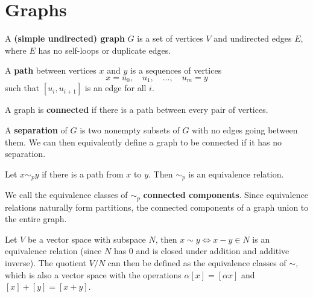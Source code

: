 \documentclass[twoside,10pt]{article}
\begin{document}

\section{Graphs}

\begin{defn}[]
	A \textbf{(simple undirected) graph} $G$ is a set of vertices $V$ and undirected edges $E$, where $E$ has no self-loops or duplicate edges.
\end{defn}

\begin{defn}[]
	A \textbf{path} between vertices $x$ and $y$ is a sequences of vertices
	\[
	x=u_0, \quad u_1, \quad \dots, \quad u_m=y
\] such that $[u_i,u_{i+1}]$ is an edge for all $i$.
\end{defn}

\begin{defn}[]
A graph is \textbf{connected} if there is a path between every pair of vertices.
\end{defn}

A \textbf{separation} of $G$ is two nonempty subsets of $G$ with no edges going between them. We can then equivalently define a graph to be connected if it has no separation.

\begin{prop}
Let $x \sim_{p} y$ if there is a path from $x$ to $y$. Then $\sim_{p}$ is an equivalence relation.
\end{prop}

We call the equivalence classes of $\sim_{p}$ \textbf{connected components}. Since equivalence relations naturally form partitions, the connected components of a graph union to the entire graph.

\begin{ex}[]
	Let $V$ be a vector space with subspace $N$, then $x \sim y \iff x - y \in N$ is an equivalence relation (since $N$ has 0 and is closed under addition and additive inverse). The quotient $V/N$ can then be defined as the equivalence classes of $\sim$, which is also a vector space with the operations $\alpha[x] = [\alpha x]$ and $[x]+[y] = [x+y]$.
\end{ex}

\end{document}
